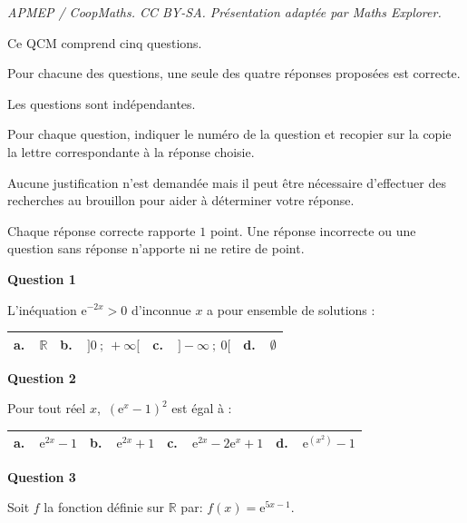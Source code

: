 \documentclass[10pt]{article}
\providecommand{\R}{\mathbb{R}}
\begin{document}
\noindent\textit{APMEP / CoopMaths. CC BY-SA. Présentation adaptée par Maths Explorer.}\par\medskip
\medskip

Ce QCM comprend cinq questions.

Pour chacune des questions, une seule des quatre réponses proposées est correcte.

Les questions sont indépendantes.

Pour chaque question, indiquer le numéro de la question et recopier sur la copie la lettre correspondante à la réponse choisie.

Aucune justification n'est demandée mais il peut être nécessaire d'effectuer des recherches au brouillon pour aider à déterminer votre réponse.

Chaque réponse correcte rapporte $1$ point. Une réponse incorrecte ou une question sans réponse n'apporte ni ne retire de point.

\medskip

\textbf{Question 1}

\medskip

L'inéquation $\text{e}^{-2x} > 0$ d'inconnue $x$ a pour ensemble de solutions :

\begin{center}
\begin{tabularx}{\linewidth}{|*{4}{X|}}\hline
\textbf{a.~~}$\R$& \textbf{b.~~}$]0~;~ +\infty[$&\textbf{c.~~}$]- \infty~;~0[$&\textbf{d.~~}$\emptyset$ 
\\ \hline
\end{tabularx}
\end{center}

\medskip

\textbf{Question 2}

Pour tout réel $x$,\, $\left(\text{e}^{x} - 1\right)^2$ est égal à : 

\begin{center}
\begin{tabularx}{\linewidth}{|*{4}{X|}}\hline
\textbf{a.~~}$\text{e}^{2x} - 1$&\textbf{b.~~}$\text{e}^{2x} + 1$&\textbf{c.~~}$\text{e}^{2x} - 2\text{e}^{x}  + 1$&\textbf{d.~~}$\text{e}^{\left(x^2 \right)} - 1$\\ \hline
\end{tabularx}
\end{center}

\medskip

\textbf{Question 3}

Soit $f$ la fonction définie sur $\R$ par: $f(x) = \text{e}^{5x- 1}$.
\end{document}
